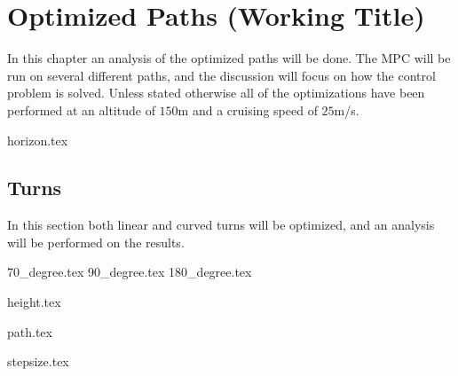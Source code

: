 \chapter{Optimized Paths (Working Title)}


In this chapter an analysis of the optimized paths will be done. The MPC will be run on several different paths, and the discussion will focus on how the control problem is solved. Unless stated otherwise all of the optimizations have been performed at an altitude of $150$m and a cruising speed of $25$m/s.

{horizon.tex}

\section{Turns}

In this section both linear and curved turns will be optimized, and an analysis will be performed on the results.

{70_degree.tex}
{90_degree.tex}
{180_degree.tex}	

{height.tex}

{path.tex}

{stepsize.tex}